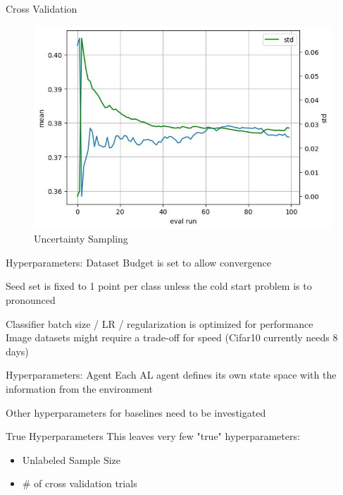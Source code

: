 \documentclass[aspectratio=169, 11pt, invertlogo]{ismll-slides}
\begin{document}
\begin{frame}[fragile]{Cross Validation}
	\begin{figure}
		\centering
		\includegraphics[width=.7\linewidth]{pics/splice_margin100_convergence.jpg}
		\caption*{Uncertainty Sampling}
	\end{figure}
\end{frame}


\begin{frame}[fragile]{Hyperparameters: Dataset}
	Budget is set to allow convergence 
	
	Seed set is fixed to 1 point per class unless the cold start problem is to pronounced
	
	Classifier batch size / LR / regularization is optimized for performance \\
	Image datasets might require a trade-off for speed (Cifar10 currently needs 8 days)
\end{frame}


\begin{frame}[fragile]{Hyperparameters: Agent}
	Each AL agent defines its own state space with the information from the environment
	
	Other hyperparameters for baselines need to be investigated
\end{frame}


\begin{frame}[fragile]{True Hyperparameters}
	This leaves very few "true" hyperparameters: 
	\begin{itemize}
		\item Unlabeled Sample Size
		\item \# of cross validation trials
	\end{itemize}
\end{frame}
\end{document}
